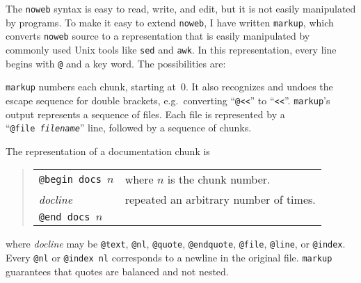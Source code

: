 The \verb+noweb+ syntax is easy to read, write, and edit, but it is
not easily manipulated by programs.
To make it easy to extend \verb+noweb+, I have written
\verb+markup+, which converts \verb+noweb+ source to 
 a representation that is easily manipulated
by commonly used Unix tools like {\tt sed} and {\tt awk}.
In this representation,
every line begins with {\tt @} and a key word.
The possibilities are:
\begin{quote}
\leavevmode{}
\end{quote}
{\tt markup} numbers each chunk, starting at~0.
It also recognizes and undoes the escape sequence for double brackets,
e.g.~converting ``{\tt @<<}'' to ``{\tt <<}''.
{\tt markup}'s output represents a sequence of files.
Each file is represented by a ``{\tt @file~{\rm\it filename}}'' line,
followed by a sequence of chunks.

The representation of a documentation chunk is
\begin{quote}
\begin{tabular}{ll}
\tt @begin docs $n$&where $n$ is the chunk number.\\
{\it docline}&repeated an arbitrary number of times.\\
\tt @end docs $n$
\end{tabular}
\end{quote}
where {\it docline} may be {\tt @text}, {\tt @nl}, {\tt @quote},
{\tt @endquote}, {\tt @file}, {\tt @line}, or {\tt @index}.
Every {\tt @nl} or {\tt @index~nl} corresponds to a newline in the original file.
{\tt markup} guarantees that quotes are balanced and not nested.

